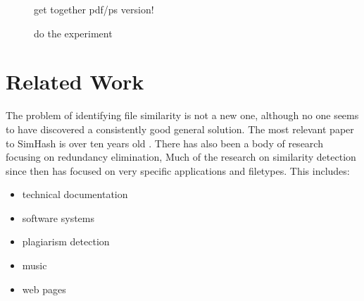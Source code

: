 \documentclass[10pt, twocolumn]{article}
\begin{document}
 \begin{figure}[h] 
 \centering
\caption{get together pdf/ps version!}
\label{headerFiles}
\end{figure}  

 \begin{figure}[h] 
 \centering
\caption{do the experiment}
\label{appendData}
\end{figure}  


\section{Related Work}

The problem of identifying file similarity is not a new one, although no one seems to have discovered a consistently good general solution. The most relevant paper to SimHash is over ten years old \cite{manber}. There has also been a body of research focusing on redundancy elimination, Much of the research on similarity detection since then has focused on very specific applications and filetypes. This includes:
\begin{itemize}
\item technical documentation \cite{hpDocRepositories} 
\item software systems \cite{sourcecode} 
\item plagiarism detection \cite{hoad} \cite{bernstein}
\item music \cite{music}
\item web pages \cite{buttler}
\end{itemize}
\end{document}
